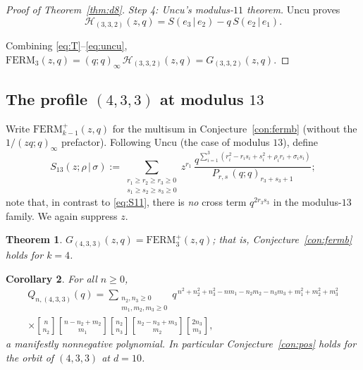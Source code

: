 \documentclass[11pt]{article}
\newtheorem{theorem}{Theorem}[section]
\newtheorem{corollary}[theorem]{Corollary}
\newcommand{\qbin}[2]{\genfrac{[}{]}{0pt}{}{#1}{#2}}
\newcommand{\poch}[1]{(q;q)_{#1}}
\newcommand{\FERM}{\mathrm{FERM}}
\begin{document}
\begin{proof}[Proof of Theorem~\ref{thm:d8}]
\emph{Step 4: Uncu's modulus-$11$ theorem.}
Uncu \cite[Eq.~(4.1) and Theorem~4.3]{Uncu23} proves
\begin{equation}\label{eq:uncu}
\mathcal{H}_{(3,3,2)}(z,q)=S(e_3\,|\,e_2)-q\,S(e_2\,|\,e_1).
\end{equation}

Combining \eqref{eq:T}--\eqref{eq:uncu},
$\FERM_3(z,q)=\poch{\infty}\,\mathcal{H}_{(3,3,2)}(z,q)
=G_{(3,3,2)}(z,q)$.
\end{proof}

\subsection*{The profile $(4,3,3)$ at modulus $13$}

Write $\FERM^{+}_{k-1}(z,q)$ for the multisum in
Conjecture~\ref{con:fermb} (without the $1/(zq;q)_\infty$ prefactor).
Following Uncu \cite[Eq.~(2.10)]{Uncu23} (the case of modulus $13$),
define
\begin{equation}\label{eq:S13}
S_{13}(z;\rho\,|\,\sigma):=
\sum_{\substack{r_1\ge r_2\ge r_3\ge 0\\ s_1\ge s_2\ge s_3\ge 0}}
z^{r_1}\,
\frac{q^{\sum_{i=1}^{3}(r_i^2-r_is_i+s_i^2+\rho_ir_i+\sigma_is_i)}}
{P_{r,s}\,\poch{r_3+s_3+1}} ;
\end{equation}
note that, in contrast to \eqref{eq:S11}, there is \emph{no} cross term
$q^{2r_3s_3}$ in the modulus-$13$ family. We again suppress $z$.

\begin{theorem}\label{thm:d10}
$G_{(4,3,3)}(z,q)=\FERM^{+}_3(z,q)$; that is, Conjecture~\ref{con:fermb}
holds for $k=4$.
\end{theorem}

\begin{corollary}\label{cor:d10pos}
For all $n\ge 0$,
\begin{multline*}
Q_{n,(4,3,3)}(q)=
\sum_{\substack{n_2,n_3\ge 0\\ m_1,m_2,m_3\ge 0}}
q^{\,n^2+n_2^2+n_3^2-nm_1-n_2m_2-n_3m_3+m_1^2+m_2^2+m_3^2}\\
\times\qbin{n}{n_2}\qbin{n-n_2+m_2}{m_1}
\qbin{n_2}{n_3}\qbin{n_2-n_3+m_3}{m_2}\qbin{2n_3}{m_3},
\end{multline*}
a manifestly nonnegative polynomial. In particular
Conjecture~\ref{con:pos} holds for the orbit of $(4,3,3)$ at $d=10$.
\end{corollary}
\end{document}
